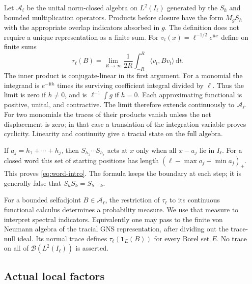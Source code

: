 \documentclass[11pt,reqno]{amsart}
\numberwithin{equation}{section}
\newcommand{\dd}{\,\mathrm d}
\newcommand{\ii}{\mathrm i}
\newcommand{\one}{\mathbf 1}
\newcommand{\ip}[2]{\langle#1,#2\rangle}
\begin{document}
Let $\mathcal A_\ell$ be the unital norm-closed algebra on
$L^2(I_\ell)$ generated by the $S_h$ and bounded multiplication
operators. Products before closure have the form
$M_gS_h$ with the appropriate overlap indicators absorbed in $g$.
The definition does not require a unique representation as a finite sum.
For $v_t(x)=\ell^{-1/2}e^{\ii tx}$ define on finite sums
\begin{equation}\label{eq:trace-construction}
 \tau_\ell(B)=\lim_{R\to\infty}\frac1{2R}
                 \int_{-R}^R\ip{v_t}{Bv_t}\dd t.
\end{equation}
The inner product is conjugate-linear in its first argument.
For a monomial the integrand is $e^{-\ii th}$ times its surviving
coefficient integral divided by $\ell$. Thus the limit is zero
if $h\ne0$, and is $\ell^{-1}\int g$ if $h=0$.
Each approximating functional is positive, unital, and contractive.
The limit therefore extends continuously to $\mathcal A_\ell$.
For two monomials the traces of their products vanish unless the
net displacement is zero; in that case a translation of the
integration variable proves cyclicity. Linearity and continuity
give a tracial state on the full algebra.

If $a_j=h_1+\cdots+h_j$, then
$S_{h_1}\cdots S_{h_r}$ acts at $x$ only when all $x-a_j$ lie in
$I_\ell$. For a closed word this set of starting positions has
length $(\ell-\max a_j+\min a_j)_+$. This proves
\eqref{eq:word-intro}. The formula keeps the boundary at each
step; it is generally false that $S_hS_k=S_{h+k}$.

For a bounded selfadjoint $B\in\mathcal A_\ell$, the restriction of
$\tau_\ell$ to its continuous functional calculus determines a
probability measure. We use that measure to interpret spectral
indicators. Equivalently one may pass to the finite von Neumann
algebra of the tracial GNS representation, after dividing out the
trace-null ideal. Its normal trace defines $\tau_\ell(\one_E(B))$
for every Borel set $E$. No trace on all of
$\mathcal B(L^2(I_\ell))$ is asserted.

\subsection*{Actual local factors}
\end{document}
